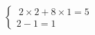 \documentclass[preview]{standalone}
\begin{document}
\begin{align*}
\left\{ \begin{array}{cl} \ 2\times2 + 8\times1 = 5 \\[1pt] 2 - 1 = 1 \end{array} \right.
\end{align*}
\end{document}
